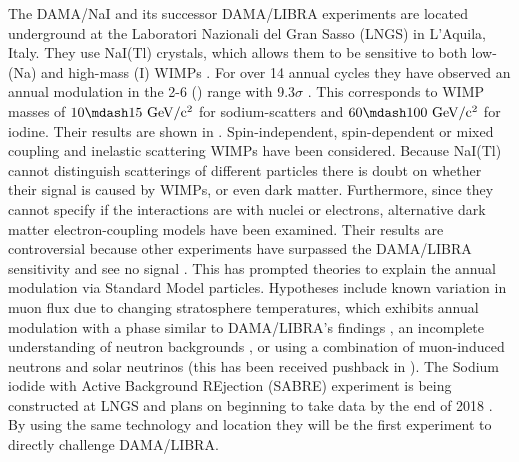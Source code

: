 The DAMA/NaI and its successor DAMA/LIBRA experiments are located underground at the Laboratori Nazionali del Gran Sasso (LNGS) in
L'Aquila, Italy.  They use NaI(Tl) crystals, which allows them to be sensitive to both low- (Na) and high-mass (I) WIMPs
.  For over 14 annual cycles they have observed an annual modulation in the
2-6 \kevee ()
range with 9.3$\sigma$ .  This corresponds to WIMP masses of $10 \mdash 15\ \mathrm{GeV/c^2}$ for sodium-scatters
and $60 \mdash 100\ \mathrm{GeV/c^2}$ for iodine.  Their results are shown in .  Spin-independent, spin-dependent or
mixed coupling  and inelastic scattering  WIMPs 
have been considered.  Because NaI(Tl) cannot distinguish scatterings of different
particles there is doubt on whether their signal
is caused by WIMPs, or even dark matter.  Furthermore, since they cannot specify if the interactions are with nuclei or electrons,
alternative dark matter
electron-coupling models  have been examined.  Their results are controversial because other experiments
have surpassed the DAMA/LIBRA sensitivity and see no signal .  This has prompted theories to explain the annual
modulation via
Standard Model particles.  Hypotheses include known variation in muon flux due to changing stratosphere temperatures, which exhibits
annual modulation with a phase similar to DAMA/LIBRA's findings , an incomplete understanding of neutron backgrounds
, or using a combination of muon-induced neutrons and solar neutrinos  (this
has been received pushback in ).  The Sodium iodide with Active Background REjection (SABRE) experiment
is being constructed at LNGS and plans on beginning to take data by the end of 2018 .  By using the same
technology and location they will be the first experiment to directly challenge DAMA/LIBRA.

